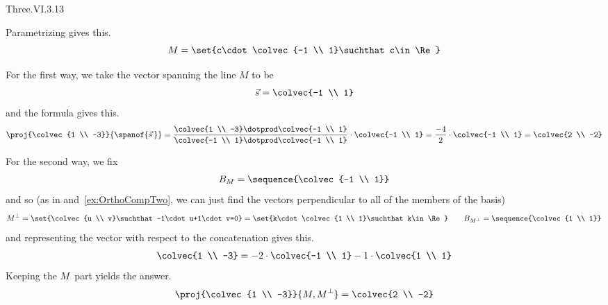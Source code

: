 \begin{ans}{Three.VI.3.13}
       \begin{exparts}
         \partsitem Parametrizing gives this.
           \begin{equation*}
             M=\set{c\cdot\colvec{-1 \\ 1}\suchthat c\in\Re}
           \end{equation*}

           For the first way, we take the vector spanning the line $M$ to be
           \begin{equation*}
             \vec{s}=\colvec{-1 \\ 1}
           \end{equation*}
           and the  formula gives this.
           \begin{equation*}
             \proj{\colvec{1 \\ -3}}{\spanof{\vec{s}\,}}
              =\frac{\colvec{1 \\ -3}\dotprod\colvec{-1 \\ 1}}{
                     \colvec{-1 \\ 1}\dotprod\colvec{-1 \\ 1}}
                \cdot\colvec{-1 \\ 1}
              =\frac{-4}{2}
                \cdot\colvec{-1 \\ 1}
              =\colvec{2 \\ -2}
           \end{equation*}

           For the second way, we fix
           \begin{equation*}
             B_M=\sequence{\colvec{-1 \\ 1}}
           \end{equation*}
           and so
           (as in  and~\ref{ex:OrthoCompTwo},
           we can just find the vectors perpendicular to all of the members
           of the basis)
           \begin{equation*}
             M^\perp
             =\set{\colvec{u \\ v}\suchthat -1\cdot u+1\cdot v=0}
             =\set{k\cdot\colvec{1 \\ 1}\suchthat k\in\Re}
             \qquad
             B_{M^\perp}=\sequence{\colvec{1 \\ 1}}
           \end{equation*}
           and representing the vector with respect to the concatenation
           gives this.
           \begin{equation*}
             \colvec{1 \\ -3}=-2\cdot\colvec{-1 \\ 1}-1\cdot\colvec{1 \\ 1}
           \end{equation*}
           Keeping the $M$~part yields the answer.
           \begin{equation*}
             \proj{\colvec{1 \\ -3}}{M,M^\perp}=\colvec{2 \\ -2}
           \end{equation*}


\end{exparts}
\end{ans}
